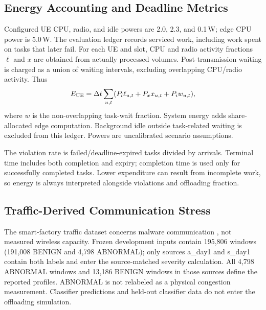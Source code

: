 \documentclass[conference]{IEEEtran}
\begin{document}
\subsection{Energy Accounting and Deadline Metrics}
Configured UE CPU, radio, and idle powers are 2.0, 2.3, and 0.1\,W; edge CPU power is 5.0\,W. The evaluation ledger records serviced work, including work spent on tasks that later fail. For each UE and slot, CPU and radio activity fractions $\ell$ and $x$ are obtained from actually processed volumes. Post-transmission waiting is charged as a union of waiting intervals, excluding overlapping CPU/radio activity. Thus
\begin{equation}
E_{\rm UE}=\Delta t\sum_{u,t}(P_l\ell_{u,t}+P_xx_{u,t}+P_iw_{u,t}),
\label{eq:energy}
\end{equation}
where $w$ is the non-overlapping task-wait fraction. System energy adds share-allocated edge computation. Background idle outside task-related waiting is excluded from this ledger. Powers are uncalibrated scenario assumptions.

The violation rate is failed/deadline-expired tasks divided by arrivals. Terminal time includes both completion and expiry; completion time is used only for successfully completed tasks. Lower expenditure can result from incomplete work, so energy is always interpreted alongside violations and offloading fraction.

\subsection{Traffic-Derived Communication Stress}
The smart-factory traffic dataset concerns malware communication \cite{Traffic}, not measured wireless capacity. Frozen development inputs contain 195,806 windows (191,008 BENIGN and 4,798 ABNORMAL); only sources a\_day1 and s\_day1 contain both labels and enter the source-matched severity calculation. All 4,798 ABNORMAL windows and 13,186 BENIGN windows in those sources define the reported profiles. ABNORMAL is not relabeled as a physical congestion measurement. Classifier predictions and held-out classifier data do not enter the offloading simulation.
\end{document}
